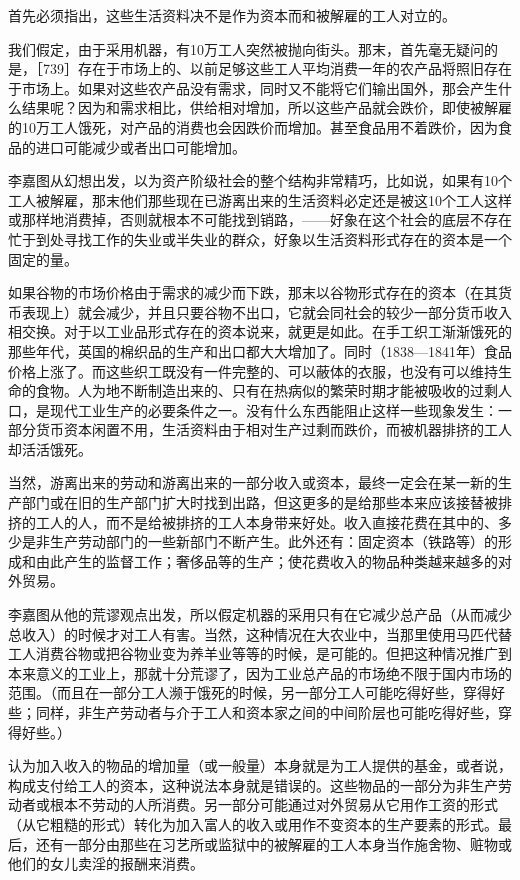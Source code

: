 首先必须指出，这些生活资料决不是作为资本而和被解雇的工人对立的。

我们假定，由于采用机器，有10万工人突然被抛向街头。那末，首先毫无疑问的是，［739］存在于市场上的、以前足够这些工人平均消费一年的农产品将照旧存在于市场上。如果对这些农产品没有需求，同时又不能将它们输出国外，那会产生什么结果呢？因为和需求相比，供给相对增加，所以这些产品就会跌价，即使被解雇的10万工人饿死，对产品的消费也会因跌价而增加。甚至食品用不着跌价，因为食品的进口可能减少或者出口可能增加。

李嘉图从幻想出发，以为资产阶级社会的整个结构非常精巧，比如说，如果有10个工人被解雇，那末他们那些现在已游离出来的生活资料必定还是被这10个工人这样或那样地消费掉，否则就根本不可能找到销路，——好象在这个社会的底层不存在忙于到处寻找工作的失业或半失业的群众，好象以生活资料形式存在的资本是一个固定的量。

如果谷物的市场价格由于需求的减少而下跌，那末以谷物形式存在的资本（在其货币表现上）就会减少，并且只要谷物不出口，它就会同社会的较少一部分货币收入相交换。对于以工业品形式存在的资本说来，就更是如此。在手工织工渐渐饿死的那些年代，英国的棉织品的生产和出口都大大增加了。同时（1838—1841年）食品价格上涨了。而这些织工既没有一件完整的、可以蔽体的衣服，也没有可以维持生命的食物。人为地不断制造出来的、只有在热病似的繁荣时期才能被吸收的过剩人口，是现代工业生产的必要条件之一。没有什么东西能阻止这样一些现象发生：一部分货币资本闲置不用，生活资料由于相对生产过剩而跌价，而被机器排挤的工人却活活饿死。

当然，游离出来的劳动和游离出来的一部分收入或资本，最终一定会在某一新的生产部门或在旧的生产部门扩大时找到出路，但这更多的是给那些本来应该接替被排挤的工人的人，而不是给被排挤的工人本身带来好处。收入直接花费在其中的、多少是非生产劳动部门的一些新部门不断产生。此外还有：固定资本（铁路等）的形成和由此产生的监督工作；奢侈品等的生产；使花费收入的物品种类越来越多的对外贸易。

李嘉图从他的荒谬观点出发，所以假定机器的采用只有在它减少总产品（从而减少总收入）的时候才对工人有害。当然，这种情况在大农业中，当那里使用马匹代替工人消费谷物或把谷物业变为养羊业等等的时候，是可能的。但把这种情况推广到本来意义的工业上，那就十分荒谬了，因为工业总产品的市场绝不限于国内市场的范围。（而且在一部分工人濒于饿死的时候，另一部分工人可能吃得好些，穿得好些；同样，非生产劳动者与介于工人和资本家之间的中间阶层也可能吃得好些，穿得好些。）

认为加入收入的物品的增加量（或一般量）本身就是为工人提供的基金，或者说，构成支付给工人的资本，这种说法本身就是错误的。这些物品的一部分为非生产劳动者或根本不劳动的人所消费。另一部分可能通过对外贸易从它用作工资的形式（从它粗糙的形式）转化为加入富人的收入或用作不变资本的生产要素的形式。最后，还有一部分由那些在习艺所或监狱中的被解雇的工人本身当作施舍物、赃物或他们的女儿卖淫的报酬来消费。

